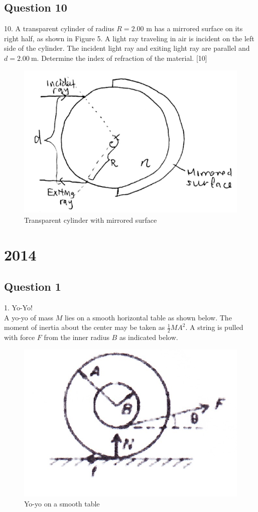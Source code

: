 \documentclass{article}
\begin{document}
\subsection{Question 10}
10. A transparent cylinder of radius $R=2.00$ m has a mirrored surface on its right half, as shown in Figure 5. A light ray traveling in air is incident on the left side of the cylinder. The incident light ray and exiting light ray are parallel and $d=2.00 \mathrm{~m}$. Determine the index of refraction of the material. [10]

\begin{figure}
	\centering
	\includegraphics[width=0.5\linewidth]{spho_book_TYS_images/2013q10.png}
	\caption{Transparent cylinder with mirrored surface}
\end{figure}

\section{2014}
\subsection{Question 1}
1. Yo-Yo! \\ A yo-yo of mass $M$ lies on a smooth horizontal table as shown below. The moment of inertia about the center may be taken as $\frac{1}{2} M A^{2} .$ A string is pulled with force $F$ from the inner radius $B$ as indicated below.

\begin{figure}
	\centering
	\includegraphics[width=0.5\linewidth]{spho_book_TYS_images/2014q1.png}
	\caption{Yo-yo on a smooth table}
\end{figure}
\end{document}
